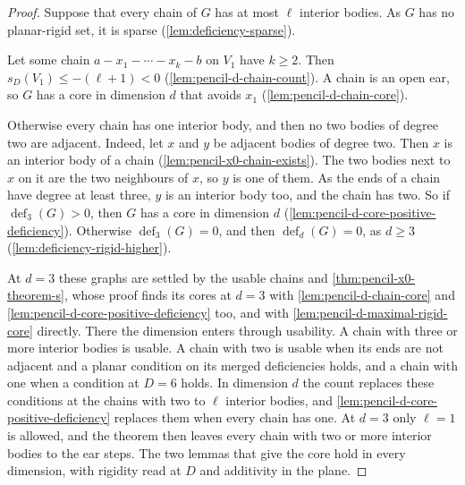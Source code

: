 \begin{proof}
  \leanok
  Suppose that every chain of $G$ has at most $\ell$ interior bodies.
  As $G$ has no planar-rigid set, it is sparse
  (\cref{lem:deficiency-sparse}).

  Let some chain $a - x_1 - \cdots - x_k - b$ on $V_1$ have $k \ge 2$.
  Then $s_D(V_1) \le -(\ell + 1) < 0$
  (\cref{lem:pencil-d-chain-count}). A chain is an open ear, so $G$ has
  a core in dimension $d$ that avoids $x_1$
  (\cref{lem:pencil-d-chain-core}).

  Otherwise every chain has one interior body, and then no two bodies
  of degree two are adjacent. Indeed, let $x$ and $y$ be adjacent bodies
  of degree two. Then $x$ is an interior body of a chain
  (\cref{lem:pencil-x0-chain-exists}). The two bodies next to $x$ on it
  are the two neighbours of $x$, so $y$ is one of them. As the ends of a
  chain have degree at least three, $y$ is an interior body too, and the
  chain has two. So if $\operatorname{def}_3(G) > 0$, then $G$ has a
  core in dimension $d$ (\cref{lem:pencil-d-core-positive-deficiency}).
  Otherwise $\operatorname{def}_3(G) = 0$, and then
  $\operatorname{def}_d(G) = 0$, as $d \ge 3$
  (\cref{lem:deficiency-rigid-higher}).

  At $d = 3$ these graphs are settled by the usable chains and
  \cref{thm:pencil-x0-theorem-s}, whose proof finds its cores at $d = 3$
  with \cref{lem:pencil-d-chain-core} and
  \cref{lem:pencil-d-core-positive-deficiency} too, and with
  \cref{lem:pencil-d-maximal-rigid-core} directly. There the dimension
  enters through usability. A chain with three or
  more interior bodies is usable. A chain with two is usable when its
  ends are not adjacent and a planar condition on its merged deficiencies
  holds, and a chain with one when a condition at $D = 6$ holds. In
  dimension $d$ the count replaces these conditions at the chains with
  two to $\ell$ interior bodies, and
  \cref{lem:pencil-d-core-positive-deficiency} replaces them when every
  chain has one. At $d = 3$ only $\ell = 1$ is allowed, and the theorem
  then leaves every chain with two or more interior bodies to the ear
  steps. The two lemmas that give the core hold in every dimension, with
  rigidity read at $D$ and additivity in the plane.
\end{proof}

